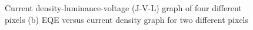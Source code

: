 \documentclass[
  letterpaper,
  DIV=11,
  numbers=noendperiod,
  oneside]{scrreprt}
\begin{document}
\begin{figure}

\begin{minipage}[t]{0.50\linewidth}

{\centering 


}

\subcaption{\label{fig-mjvl}}
\end{minipage}%
%
\begin{minipage}[t]{0.50\linewidth}

{\centering 


}

\subcaption{\label{fig-meqe}}
\end{minipage}%

\caption{\label{fig-multidpa}Current density-luminance-voltage (J-V-L)
graph of four different pixels (b) EQE versus current density graph for
two different pixels}

\end{figure}
\end{document}

